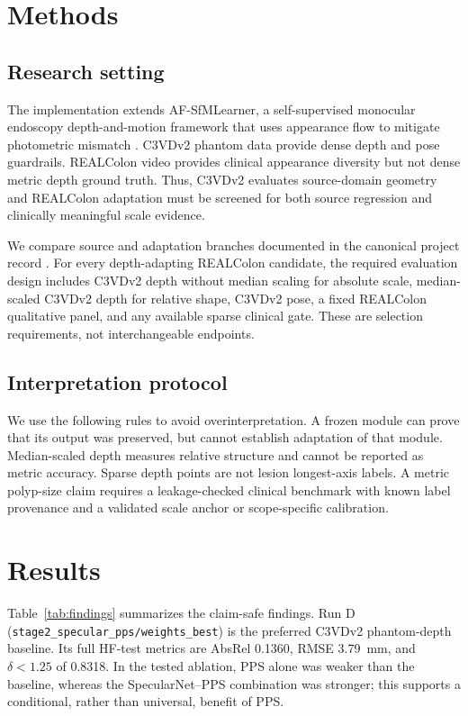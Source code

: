 \documentclass[11pt]{article}
\begin{document}
\section{Methods}

\subsection{Research setting}

The implementation extends AF-SfMLearner, a self-supervised monocular
endoscopy depth-and-motion framework that uses appearance flow to mitigate
photometric mismatch \cite{shao2022afsfm}. C3VDv2 phantom data provide dense
depth and pose guardrails. REALColon video provides clinical appearance
diversity but not dense metric depth ground truth. Thus, C3VDv2 evaluates
source-domain geometry and REALColon adaptation must be screened for both
source regression and clinically meaningful scale evidence.

We compare source and adaptation branches documented in the canonical project
record \cite{projectrecord2026}. For every depth-adapting REALColon candidate,
the required evaluation design includes C3VDv2 depth without median scaling for
absolute scale, median-scaled C3VDv2 depth for relative shape, C3VDv2 pose, a
fixed REALColon qualitative panel, and any available sparse clinical gate.
These are selection requirements, not interchangeable endpoints.

\subsection{Interpretation protocol}

We use the following rules to avoid overinterpretation. A frozen module can
prove that its output was preserved, but cannot establish adaptation of that
module. Median-scaled depth measures relative structure and cannot be reported
as metric accuracy. Sparse depth points are not lesion longest-axis labels. A
metric polyp-size claim requires a leakage-checked clinical benchmark with
known label provenance and a validated scale anchor or scope-specific
calibration.

\section{Results}

Table~\ref{tab:findings} summarizes the claim-safe findings. Run D
(\texttt{stage2\_specular\_pps/weights\_best}) is the preferred C3VDv2
phantom-depth baseline. Its full HF-test metrics are AbsRel 0.1360, RMSE
3.79~mm, and $\delta<1.25$ of 0.8318. In the tested ablation, PPS alone was
weaker than the baseline, whereas the SpecularNet--PPS combination was
stronger; this supports a conditional, rather than universal, benefit of PPS.
\end{document}
